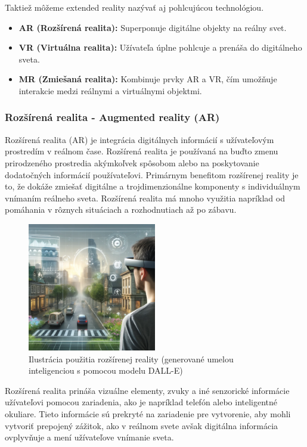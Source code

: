 Taktiež môžeme extended reality nazývať aj pohlcujúcou technológiou. \cite{armXR2022}

\begin{itemize}
    \item \textbf{AR (Rozšírená realita):} Superponuje digitálne objekty na reálny svet.
    \item \textbf{VR (Virtuálna realita):} Užívateľa úplne pohlcuje a prenáša do digitálneho sveta.
    \item \textbf{MR (Zmiešaná realita):} Kombinuje prvky AR a VR, čím umožňuje interakcie medzi reálnymi a virtuálnymi objektmi.
\end{itemize}

\subsubsection{Rozšírená realita - Augmented reality (AR)}

Rozšírená realita (AR) je integrácia digitálnych informácií s užívateľovým prostredím v reálnom čase. Rozšírená realita je používaná na buďto zmenu prirodzeného prostredia akýmkoľvek spôsobom alebo na poskytovanie dodatočných informácií používateľovi. Primárnym benefitom rozšírenej reality je to, že dokáže zmiešať digitálne a trojdimenzionálne komponenty s individuálnym vnímaním reálneho sveta. Rozšírená realita má mnoho využitia napríklad od pomáhania v rôznych situáciach a rozhodnutiach až po zábavu.

\begin{figure}[h]
  \centering
  \includegraphics[width=0.5\textwidth]{img/rozsirena_realita.png}
  \caption{Ilustrácia použitia rozšírenej reality (generované umelou inteligenciou s pomocou modelu DALL-E)}
  \label{fig:roz_real}
\end{figure}

Rozšírená realita prináša vizuálne elementy, zvuky a iné senzorické informácie užívateľovi pomocou zariadenia, ako je napríklad telefón alebo inteligentné okuliare. Tieto informácie sú prekryté na zariadenie pre vytvorenie, aby mohli vytvoriť prepojený zážitok, ako v reálnom svete avšak digitálna informácia ovplyvňuje a mení užívateľove vnímanie sveta. 

